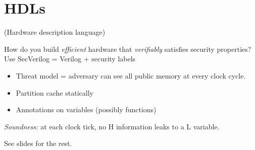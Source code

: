 \documentclass{article}
\begin{document}
\section{HDLs}
(Hardware description language)

How do you build \emph{efficient} hardware that \emph{verifiably} satisfies security properties?
Use SecVerilog = Verilog + security labels

\begin{itemize}
\item Threat model = adversary can see all public memory at every clock cycle.

\item Partition cache statically

\item Annotations on variables (possibly functions)
  
\end{itemize}

\emph{Soundness:} at each clock tick, no H information leaks to a L variable.
  
See slides for the rest.
\end{document}

